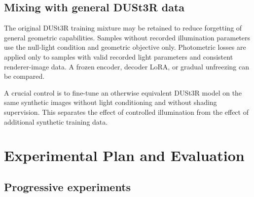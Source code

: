 \documentclass[11pt,a4paper]{article}
\begin{document}
\subsection{Mixing with general DUSt3R data}

The original DUSt3R training mixture may be retained to reduce forgetting
of general geometric capabilities. Samples without recorded illumination parameters
use the null-light condition and geometric objective only. Photometric
losses are applied only to samples with valid recorded light parameters and consistent renderer-image data. A frozen encoder, decoder LoRA, or gradual unfreezing
can be compared.

A crucial control is to fine-tune an otherwise equivalent DUSt3R model
on the same synthetic images without light conditioning and without
shading supervision. This separates the effect of controlled illumination
from the effect of additional synthetic training data.

\section{Experimental Plan and Evaluation}

\subsection{Progressive experiments}
\end{document}
